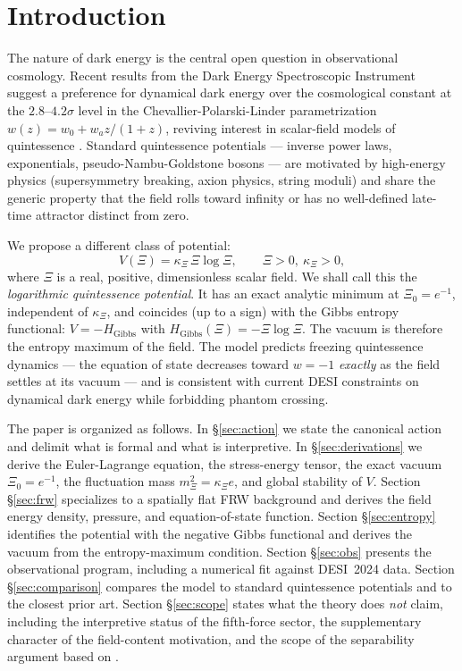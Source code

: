\documentclass[11pt,reqno]{amsart}
\theoremstyle{plain}
\theoremstyle{definition}
\theoremstyle{remark}
\newcommand{\Gibbs}{\mathrm{Gibbs}}
\begin{document}
\section{Introduction}

The nature of dark energy is the central open question in observational
cosmology. Recent results from the Dark Energy Spectroscopic Instrument
\cite{DESI2024BAO,DESI2024VI} suggest a preference for dynamical dark energy
over the cosmological constant at the $2.8$--$4.2\sigma$ level in the
Chevallier-Polarski-Linder \cite{CPL2001} parametrization $w(z)=w_0+w_a z/(1+z)$,
reviving interest in scalar-field models of quintessence
\cite{RatraPeebles1988,Wetterich1988,Frieman1995}. Standard
quintessence potentials --- inverse power laws, exponentials, pseudo-Nambu-Goldstone
bosons --- are motivated by high-energy physics (supersymmetry breaking, axion
physics, string moduli) and share the generic property that the field rolls
toward infinity or has no well-defined late-time attractor distinct from zero.

We propose a different class of potential:
\begin{equation}\label{eq:Vxi}
  V(\Xi)=\kappa_\Xi\,\Xi\log\Xi,
  \qquad \Xi>0,\ \kappa_\Xi>0,
\end{equation}
where $\Xi$ is a real, positive, dimensionless scalar field. We shall call this
the \emph{logarithmic quintessence potential}. It has an exact analytic minimum
at $\Xi_0=e^{-1}$, independent of $\kappa_\Xi$, and coincides (up to a sign)
with the Gibbs entropy functional: $V=-H_{\Gibbs}$ with
$H_{\Gibbs}(\Xi)=-\Xi\log\Xi$. The vacuum is therefore the entropy maximum of
the field. The model predicts freezing quintessence dynamics --- the equation
of state decreases toward $w=-1$ \emph{exactly} as the field settles at its
vacuum --- and is consistent with current DESI constraints on dynamical dark
energy while forbidding phantom crossing.

The paper is organized as follows. In \S\ref{sec:action} we state the canonical
action and delimit what is formal and what is interpretive. In
\S\ref{sec:derivations} we derive the Euler-Lagrange equation, the stress-energy
tensor, the exact vacuum $\Xi_0=e^{-1}$, the fluctuation mass
$m_\Xi^{2}=\kappa_\Xi e$, and global stability of $V$. Section \S\ref{sec:frw}
specializes to a spatially flat FRW background and derives the field energy
density, pressure, and equation-of-state function. Section \S\ref{sec:entropy}
identifies the potential with the negative Gibbs functional and derives the
vacuum from the entropy-maximum condition. Section \S\ref{sec:obs} presents the
observational program, including a numerical fit against DESI~2024 data. Section
\S\ref{sec:comparison} compares the model to standard quintessence potentials
and to the closest prior art. Section \S\ref{sec:scope} states what the theory
does \emph{not} claim, including the interpretive status of the fifth-force
sector, the supplementary character of the field-content motivation, and the
scope of the separability argument based on
\cite{BialynickiBirulaMycielski1976}.
\end{document}
